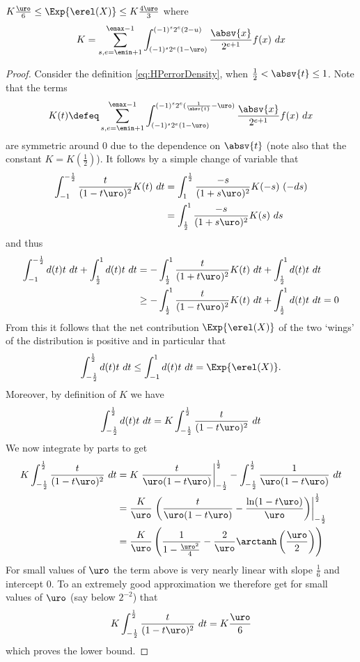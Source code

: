 \begin{proposition}\label{prop:ExpError}
$K\frac{\uro}{6}\leq \Exp{\erel(X)}\leq K\frac{4\uro}{3}$
where
\[
K=\sum_{s,e=\emin+1}^{\emax-1} \int_{(-1)^s2^e(1-\uro)}^{(-1)^s2^e(2-u)} \frac{\absv{x}}{2^{e+1}} f(x) ~dx
\]
\end{proposition}
\begin{proof}
Consider the definition \cref{eq:HPerrorDensity}, when $\frac{1}{2}< \absv{t}\leq 1$. Note that the terms
\[
K(t)\defeq \sum\limits_{s, e=\emin+1}^{\emax-1} \int_{(-1)^s2^e(1-\uro)}^{(-1)^s2^e(\frac{1}{\absv{t}}-\uro)} \frac{\absv{x}}{2^{e+1}} f(x) ~dx
\]
are symmetric around 0 due to the dependence on $\absv{t}$ (note also that the constant $K= K(\frac{1}{2})$). It follows by a simple change of variable that
\begin{align*} 
\int_{-1}^{-\frac{1}{2}} \frac{t}{(1-t\uro)^2}K(t)~dt &= \int_{1}^{\frac{1}{2}}\frac{-s}{(1+s\uro)^2}K(-s)~(-ds)\\
&= \int_{\frac{1}{2}}^1 \frac{-s}{(1+s\uro)^2}K(s)~ds
\end{align*}
and thus
\begin{align*}
\int_{-1}^{-\frac{1}{2}} d(t)t~dt + \int^{1}_{\frac{1}{2}} d(t)t~dt& = -\int_{\frac{1}{2}}^{1}\frac{t}{(1+t\uro)^2} K(t)~dt +  \int^{1}_{\frac{1}{2}} d(t)t~dt
\\
& \geq - \int_{\frac{1}{2}}^{1}\frac{t}{(1-t\uro)^2} K(t)~dt + \int^{1}_{\frac{1}{2}} d(t)t~dt = 0
\end{align*}
From this it follows that the net contribution $\Exp{\erel(X)}$ of the two `wings' of the distribution is positive and in particular that
\[
\int_{-\frac{1}{2}}^{\frac{1}{2}}d(t) t~dt\leq \int_{-1}^{1}d(t) t~dt=\Exp{\erel(X)}.
\]
Moreover, by definition of $K$ we have
\[
\int_{-\frac{1}{2}}^{\frac{1}{2}}d(t) t~dt = K\int_{-\frac{1}{2}}^{\frac{1}{2}}\frac{t}{(1-t\uro)^2}~dt
\]
We now integrate by parts to get
\begin{align*}
K\int_{-\frac{1}{2}}^{\frac{1}{2}}\frac{t}{(1-t\uro)^2}~dt &= K \left.\frac{t}{\uro(1-t\uro)}\right|^{\frac{1}{2}}_{-\frac{1}{2}} - \int_{-\frac{1}{2}}^{\frac{1}{2}} \frac{1}{\uro(1-t\uro)}~dt
\\
&=\frac{K}{\uro}\left.\left(\frac{t}{\uro(1-t\uro)}-\frac{\ln(1-t\uro)}{\uro}\right)\right|^{\frac{1}{2}}_{-\frac{1}{2}}
\\
&=\frac{K}{\uro}\left(\frac{1}{1-\frac{\uro^2}{4}}- \frac{2}{\uro}\arctanh\left(\frac{\uro}{2}\right) \right)
\end{align*} 
For small values of $\uro$ the term above is very nearly linear with slope $\frac{1}{6}$ and intercept 0. To an extremely good approximation we therefore get for small values of $\uro$ (say below $2^{-2}$) that
\[
K\int_{-\frac{1}{2}}^{\frac{1}{2}}\frac{t}{(1-t\uro)^2}~dt = K\frac{\uro}{6}
\]
which proves the lower bound.


\end{proof}
